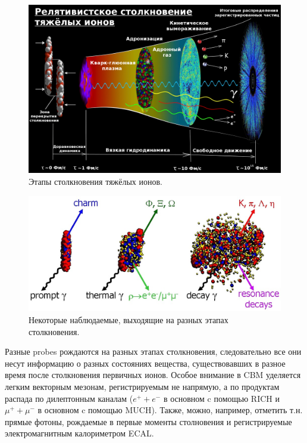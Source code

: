 \begin{figure}[H]
\includegraphics[width=1.0\textwidth]{pictures/little_bang_rus.png}
\caption{Этапы столкновения тяжёлых ионов.}
\label{fig:LittleBang}
\end{figure}

\begin{figure}[H]
\includegraphics[width=1.0\textwidth]{pictures/Heavy_ions_collision.png}
\caption{Некоторые наблюдаемые, выходящие на разных этапах столкновения.}
\label{fig:ParticlesYields}
\end{figure}

Разные probes \todo рождаются на разных этапах столкновения, следовательно все они несут информацию о разных состояниях вещества, существовавших в разное время после столкновения первичных ионов.
Особое внимание в CBM уделяется легким векторным мезонам, регистрируемым не напрямую, а по продуктам распада по дилептонным каналам ($e^{+} + e^{-}$ в основном c помощью RICH и $\mu^{+} + \mu^{-}$ в основном c помощью MUCH).
Также, можно, например, отметить т.н. прямые фотоны, рождаемые в первые моменты столновения и регистрируемые электромагнитным калориметром ECAL.

